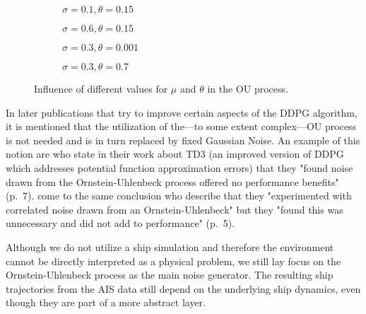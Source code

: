 \begin{figure}[H]
    \begin{subfigure}{0.495\textwidth}
      \centering
        
      \caption{$\sigma = 0.1, \theta = 0.15$}
      \label{fig:lowSigmaNoise}
    \end{subfigure}
    \begin{subfigure}{0.495\textwidth}
      \centering
        
      \caption{$\sigma = 0.6, \theta = 0.15$}
      \label{fig:highSigmaNoise}
    \end{subfigure}
\medskip %
    \begin{subfigure}{0.495\textwidth}
      \centering
        
      \caption{$\sigma = 0.3, \theta = 0.001$}
    \end{subfigure}
    \begin{subfigure}{0.495\textwidth}
      \centering
        
      \caption{$\sigma = 0.3, \theta = 0.7$}
    \end{subfigure}
\caption{Influence of different values for $\mu$ and $\theta$ in the OU process.}
\label{fig:ouProcess}
\end{figure}

\par
In later publications that try to improve certain aspects of the DDPG algorithm, it is mentioned that the utilization of the—to some extent complex—OU process is not needed and is in turn replaced by fixed Gaussian Noise. An example of this notion are \cite{fujimoto2018addressing} who state in their work about TD3 (an improved version of DDPG which addresses potential function approximation errors) that they "found noise drawn from the Ornstein-Uhlenbeck process offered no performance benefits" (p.~7). \cite{barth2018distributed} come to the same conclusion who describe that they "experimented with correlated noise drawn from an Ornstein-Uhlenbeck" but they "found this was unnecessary and did
not add to performance" (p.~5).
\par
Although we do not utilize a ship simulation and therefore the environment cannot be directly interpreted as a physical problem, we still lay focus on the Ornstein-Uhlenbeck process as the main noise generator. The resulting ship trajectories from the AIS data still depend on the underlying ship dynamics, even though they are part of a more abstract layer.